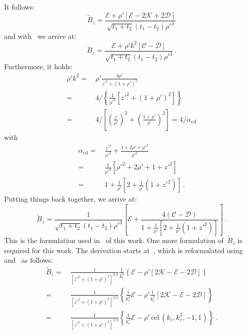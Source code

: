 It follows:
\begin{equation}
  \tilde{B}_z
 = \frac{\mathcal{E} + \rho' \left[\mathcal{E} - 2 \mathcal{K} + 2 \mathcal{D} \right]}
        {\sqrt{t_1 + t_2} (t_1 - t_2) \rho'^3}
\end{equation}
and with~ we arrive at:
\begin{equation}
  \tilde{B}_z
 = \frac{\mathcal{E} + \rho' k^2 \left[\mathcal{C} - \mathcal{D} \right]}
        {\sqrt{t_1 + t_2} (t_1 - t_2) \rho'^3} \, .
\end{equation}
Furthermore, it holds:
\begin{align}
  \rho' k^2
 =&\, \rho' \frac{4 \rho'}{z'^2 + (1 + \rho')^2} \nonumber \\
 =&\, 4 / \left\{ \frac{1}{\rho'^2} \left[ z'^2 + (1 + \rho')^2 \right] \right\} \nonumber \\
 =&\, 4 / \left[ \left( \frac{z'}{\rho'} \right)^2 + \left( \frac{1 + \rho'}{\rho'} \right)^2 \right]
 = 4 / \alpha_\textrm{cd}
\end{align}
with
\begin{align}
  \alpha_\textrm{cd}
 =&\, \frac{z'^2}{\rho'^2} + \frac{1 + 2 \rho' + \rho'^2}{\rho'^2} \nonumber \\
 =&\, \frac{1}{\rho'^2} \left[ \rho'^2 + 2 \rho' + 1 + z'^2 \right] \nonumber \\
 =&\, 1 + \frac{1}{\rho'} \left[ 2 + \frac{1}{\rho'} \left( 1 + z'^2 \right) \right] \, .
\end{align}
Putting things back together, we arrive at:
\begin{equation}
  \tilde{B}_z
 = \frac{1}{\sqrt{t_1 + t_2} (t_1 - t_2) \rho'^3}
   \left[
     \mathcal{E} + \frac{4 \left(\mathcal{C} - \mathcal{D} \right)}{1 + \frac{1}{\rho'} \left[ 2 + \frac{1}{\rho'} \left( 1 + z'^2 \right) \right]}
   \right] \, .
\end{equation}
This is the formulation used in~ of this work.
One more formulation of~$\tilde{B}_z$ is required for this work.
The derivation starts at~, which is reformulated
using~ and~ as follows:
\begin{align}
 \tilde{B}_z
 =&\, \frac{1}{\left[z'^2 + (1 + \rho')^2\right]^{3/2}} \frac{1}{k_c^2}
      \left\{ \mathcal{E} -\rho' \left[ 2 \mathcal{K} - \mathcal{E} - 2 \mathcal{D} \right] \right\} \nonumber \\
 =&\, \frac{1}{\left[z'^2 + (1 + \rho')^2\right]^{3/2}}
      \left\{ \frac{1}{k_c^2} \mathcal{E} - \rho' \frac{1}{k_c^2} \left[ 2 \mathcal{K} - \mathcal{E} - 2 \mathcal{D} \right] \right\} \nonumber \\
 =&\, \frac{1}{\left[z'^2 + (1 + \rho')^2\right]^{3/2}}
      \left\{ \frac{1}{k_c^2} \mathcal{E} - \rho' \,\textrm{cel}\,(k_c, k_c^2, -1, 1) \right\} \, .
\end{align}
